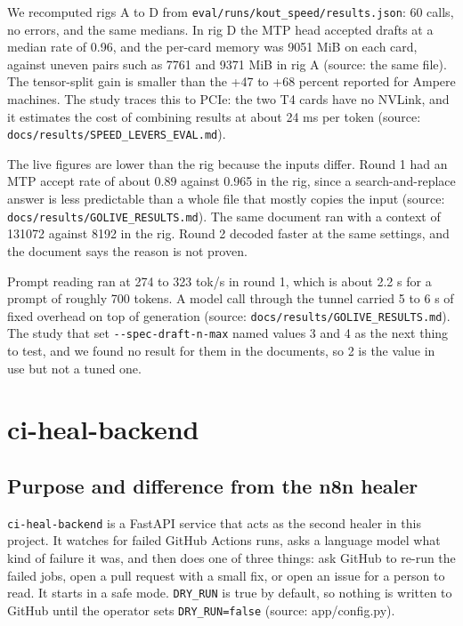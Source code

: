 \documentclass[11pt,a4paper]{report}
\begin{document}
We recomputed rigs A to D from \texttt{eval/\allowbreak{}runs/\allowbreak{}kout\_\allowbreak{}speed/\allowbreak{}results.\allowbreak{}json}: 60 calls, no errors, and the same medians. In rig D the MTP head accepted drafts at a median rate of 0.96, and the per-card memory was 9051 MiB on each card, against uneven pairs such as 7761 and 9371 MiB in rig A (source: the same file). The tensor-split gain is smaller than the +47 to +68 percent reported for Ampere machines. The study traces this to PCIe: the two T4 cards have no NVLink, and it estimates the cost of combining results at about 24 ms per token (source: \texttt{docs/\allowbreak{}results/\allowbreak{}SPEED\_\allowbreak{}LEVERS\_\allowbreak{}EVAL.\allowbreak{}md}).

The live figures are lower than the rig because the inputs differ. Round 1 had an MTP accept rate of about 0.89 against 0.965 in the rig, since a search-and-replace answer is less predictable than a whole file that mostly copies the input (source: \texttt{docs/\allowbreak{}results/\allowbreak{}GOLIVE\_\allowbreak{}RESULTS.\allowbreak{}md}). The same document ran with a context of 131072 against 8192 in the rig. Round 2 decoded faster at the same settings, and the document says the reason is not proven.

Prompt reading ran at 274 to 323 tok/s in round 1, which is about 2.2 s for a prompt of roughly 700 tokens. A model call through the tunnel carried 5 to 6 s of fixed overhead on top of generation (source: \texttt{docs/\allowbreak{}results/\allowbreak{}GOLIVE\_\allowbreak{}RESULTS.\allowbreak{}md}). The study that set \texttt{-\allowbreak{}-\allowbreak{}spec-\allowbreak{}draft-\allowbreak{}n-\allowbreak{}max} named values 3 and 4 as the next thing to test, and we found no result for them in the documents, so 2 is the value in use but not a tuned one.

\chapter{ci-heal-backend}

\section{Purpose and difference from the n8n healer}

\texttt{ci-\allowbreak{}heal-\allowbreak{}backend} is a FastAPI service that acts as the second healer in this project. It watches for failed GitHub Actions runs, asks a language model what kind of failure it was, and then does one of three things: ask GitHub to re-run the failed jobs, open a pull request with a small fix, or open an issue for a person to read. It starts in a safe mode. \texttt{DRY\_\allowbreak{}RUN} is true by default, so nothing is written to GitHub until the operator sets \texttt{DRY\_\allowbreak{}RUN=false} (source: app/config.py).
\end{document}
